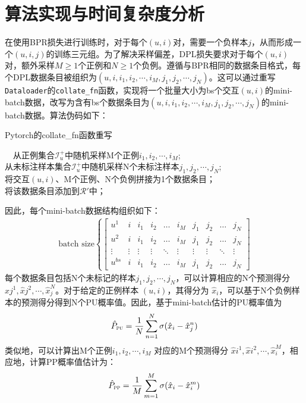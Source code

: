 \section{算法实现与时间复杂度分析}
在使用BPR损失进行训练时，对于每个$(u,i)$对，需要一个负样本$j$，从而形成一个$(u,i,j)$的训练三元组。为了解决采样偏差，DPL损失要求对于每个$(u,i)$对，额外采样$M\geq 1$个正例和$N\geq1$个负例。遵循与BPR相同的数据条目格式，每个DPL数据条目被组织为$(u,i,i_1,i_2,\cdots,i_M,j_1,j_2,\cdots,j_N)$。这可以通过重写\verb|Dataloader|的\verb|collate_fn|函数，实现将一个批量大小为bs个交互$(u,i)$的mini-batch数据，改写为含有bs个数据条目为$(u,i,i_1,i_2,\cdots,i_M,j_1,j_2,\cdots,j_N)$的mini-batch数据。算法伪码如下：
\begin{algorithm}[!]
	\caption{Pytorch的collate\_fn函数重写}\label{4Alg2:1}
	{
		~~从正例集合$\mathcal{I}_u^+$中随机采样M个正例$i_1,i_2,\cdots,i_M$;\\
		从未标注样本集合$\mathcal{I}_u^+$中随机采样N个未标注样本$j_1,j_2,\cdots,j_N$;\\
		将交互$(u,i)$、M个正例、N个负例拼接为1个数据条目；\\
		将该数据条目添加到$\mathcal{R}\prime$中；
	}
\end{algorithm}

因此，每个mini-batch数据结构组织如下：
\begin{eqnarray}\label{eq:mini}
	\text{batch size}\left\{ \left[\begin{array}{cccccccccc}
		u^{1} & {i}   &i_{1} & i_{2} & \ldots &i_{M} &   j_{1}& j_{2} & \ldots &j_{N} \\
		u^{2} & i & i_{1}& i_{2} & \ldots &i_{M} &  j_{1}& j_{2} & \ldots &j_{N} \\
		\vdots & \vdots & \vdots & \vdots &\ddots & \vdots & \vdots & \vdots & \ddots & \vdots \\
		u^{bs} & i & i_{1}& i_{2} & \ldots &i_{M} &  j_{1}& j_{2} & \ldots &j_{N} 
	\end{array}\right]\right.
\end{eqnarray}
每个数据条目包括N个未标记的样本$j_1,j_2,\cdots,j_N$，可以计算相应的N个预测得分 $\hat{x}{j}^1,\hat{x}{j}^2,\cdots,\hat{x}_{j}^N$。对于给定的正例样本 $(u,i)$，其得分为 $\hat{x}_i$，可以基于N个负例样本的预测得分得到N个PU概率值。因此，基于mini-batch估计的PU概率值为
\[\hat{P}_\textsc{pu} = \frac{1}{N} \sum_{n=1}^{N}\sigma (\hat{x}_i - \hat{x}_{j}^n)\]
类似地，可以计算出M个正例$i_1,i_2,\cdots,i_M$ 对应的M个预测得分 $\hat{x}{i}^1,\hat{x}{i}^2,\cdots,\hat{x}_{i}^M$，相应地，计算PP概率值估计为：
\[\hat{P}_\textsc{pp} = \frac{1}{M} \sum_{m=1}^{M}\sigma (\hat{x}_i - \hat{x}_{i}^m)\]

